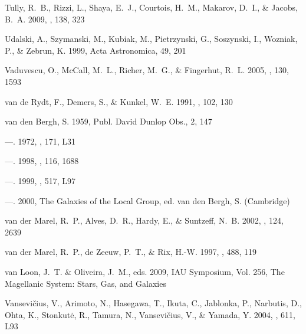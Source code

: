 \documentclass[manuscript]{aastex}
\begin{document}
\begin{thebibliography}{381}
{Tully}, R.~B., {Rizzi}, L., {Shaya}, E.~J., {Courtois}, H.~M., {Makarov},
  D.~I., \& {Jacobs}, B.~A. 2009, \aj, 138, 323

{Udalski}, A., {Szymanski}, M., {Kubiak}, M., {Pietrzynski}, G., {Soszynski},
  I., {Wozniak}, P., \& {Zebrun}, K. 1999, Acta Astronomica, 49, 201

{Vaduvescu}, O., {McCall}, M.~L., {Richer}, M.~G., \& {Fingerhut}, R.~L. 2005,
  \aj, 130, 1593

{van de Rydt}, F., {Demers}, S., \& {Kunkel}, W.~E. 1991, \aj, 102, 130

{van den Bergh}, S. 1959, Publ. David Dunlop Obs., 2, 147

---. 1972, \apjl, 171, L31

---. 1998, \aj, 116, 1688

---. 1999, \apjl, 517, L97

---. 2000, {The Galaxies of the Local Group}, ed. {van den Bergh, S.}
  (Cambridge)

{van der Marel}, R.~P., {Alves}, D.~R., {Hardy}, E., \& {Suntzeff}, N.~B. 2002,
  \aj, 124, 2639

{van der Marel}, R.~P., {de Zeeuw}, P.~T., \& {Rix}, H.-W. 1997, \apj, 488, 119

{van Loon}, J.~T. \& {Oliveira}, J.~M., eds. 2009, IAU Symposium, Vol. 256,
  {The Magellanic System: Stars, Gas, and Galaxies}

{Vansevi{\v c}ius}, V., {Arimoto}, N., {Hasegawa}, T., {Ikuta}, C., {Jablonka},
  P., {Narbutis}, D., {Ohta}, K., {Stonkut{\.e}}, R., {Tamura}, N., {Vansevi{\v
  c}ius}, V., \& {Yamada}, Y. 2004, \apjl, 611, L93


\end{thebibliography}
\end{document}
